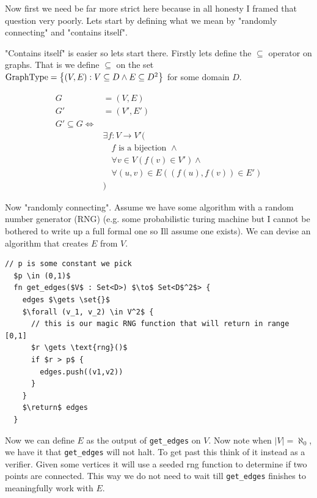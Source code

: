 \documentclass[../main.tex]{subfiles}
\begin{document}

Now first we need be far more strict here because in all honesty I framed that question very poorly. Lets start by defining what we mean by "randomly connecting" and "contains itself".

"Contains itself" is easier so lets start there. Firstly lets define the $\subseteq$ operator on graphs. That is we define $\subseteq$ on the set $\text{GraphType} = \left\{ (V,E) : V \subseteq D \land E \subseteq D^2 \right\}$ for some domain $D$.

\begin{align*}
	G                    & = (V,E)                                           \\
	G'                   & = (V' ,E')                                        \\
	G' \subseteq G  \iff &                                                   \\
	                     & \exists f : V \to V'  (                           \\
	                     & \quad f \text{ is a bijection } \land             \\
	                     & \quad \forall v \in V       (f(v) \in V') \land   \\
	                     & \quad \forall (u,v) \in E   ((f(u), f(v)) \in E') \\
	                     & )
\end{align*}

Now "randomly connecting". Assume we have some algorithm with a random number generator (RNG) (e.g. some probabilistic turing machine but I cannot be bothered to write up a full formal one so Ill assume one exists). We can devise an algorithm that creates $E$ from $V$.


\begin{algorithm}
	\caption{Edge Creation}
	\begin{lstlisting}[style=pseudo]
  // p is some constant we pick
  $p \in (0,1)$ 
  fn get_edges($V$ : Set<D>) $\to$ Set<D$^2$> {
    edges $\gets \set{}$
    $\forall (v_1, v_2) \in V^2$ {
      // this is our magic RNG function that will return in range [0,1]
      $r \gets \text{rng}()$ 
      if $r > p$ {
        edges.push((v1,v2))
      }
    }
    $\return$ edges
  }
\end{lstlisting}
\end{algorithm}

Now we can define $E$ as the output of \texttt{get\_edges} on $V$. Now note when $\lvert V \rvert = \aleph_0$, we have it that \texttt{get\_edges} will not halt. To get past this think of it instead as a verifier. Given some vertices it will use a seeded rng function to determine if two points are connected. This way we do not need to wait till \texttt{get\_edges} finishes to meaningfully work with $E$.
\end{document}
